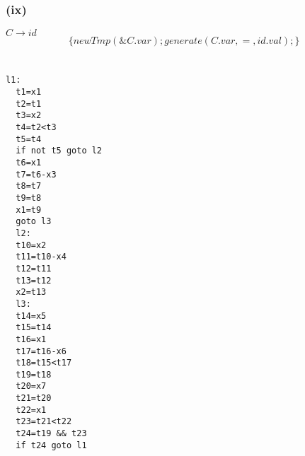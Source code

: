 \documentclass[a4paper,10pt]{jsarticle}
\begin{document}
\subsubsection*{(ix)}
$C\rightarrow id$
\[\{newTmp(\&C.var);generate(C.var, =, id.val);\}\]

\section{}
\begin{lstlisting}[caption={出力される3番地コード},label={出力される3番地コード}]
  l1:
  t1=x1
  t2=t1
  t3=x2
  t4=t2<t3
  t5=t4
  if not t5 goto l2
  t6=x1
  t7=t6-x3
  t8=t7
  t9=t8
  x1=t9
  goto l3
  l2:
  t10=x2
  t11=t10-x4
  t12=t11
  t13=t12
  x2=t13
  l3:
  t14=x5
  t15=t14
  t16=x1
  t17=t16-x6
  t18=t15<t17
  t19=t18
  t20=x7
  t21=t20
  t22=x1
  t23=t21<t22
  t24=t19 && t23
  if t24 goto l1
\end{lstlisting}
\end{document}
